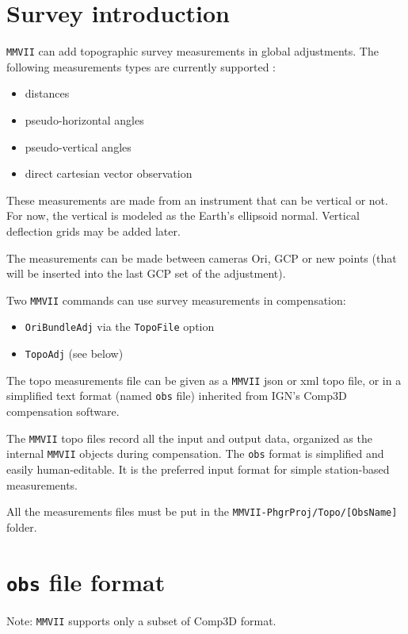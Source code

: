 \section{Survey introduction}

{\tt MMVII} can add topographic survey measurements in global adjustments.
The following measurements types are currently supported :

\begin{itemize}
    \item distances
    \item pseudo-horizontal angles
    \item pseudo-vertical angles
    \item direct cartesian vector observation
\end{itemize}

These measurements are made from an instrument that can be vertical or not.
For now, the vertical is modeled as the Earth's ellipsoid normal. Vertical deflection grids may be added later.

The measurements can be made between cameras Ori, GCP or new points (that will be inserted into the last GCP set of the adjustment).

Two {\tt MMVII} commands can use survey measurements in compensation:
\begin{itemize}
    \item {\tt OriBundleAdj} via the {\tt TopoFile} option
    \item {\tt TopoAdj} (see below)
\end{itemize}

The topo measurements file can be given as a {\tt MMVII} json or xml topo file, or in a simplified text format (named {\tt obs} file) inherited from IGN's Comp3D compensation software.

The {\tt MMVII} topo files record all the input and output data, organized as the internal {\tt MMVII} objects during compensation.
The {\tt obs} format is simplified and easily human-editable. It is the preferred input format for simple station-based measurements.

All the measurements files must be put in the {\tt MMVII-PhgrProj/Topo/[ObsName]} folder.

\section{{\tt obs} file format}
\label{sec:compObsFormat}
Note: {\tt MMVII} supports only a subset of Comp3D format.

